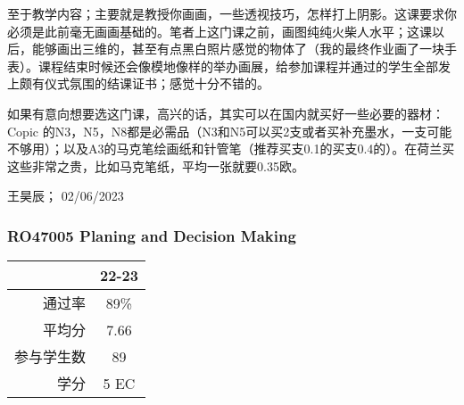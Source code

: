 至于教学内容；主要就是教授你画画，一些透视技巧，怎样打上阴影。这课要求你必须是此前毫无画画基础的。笔者上这门课之前，画图纯纯火柴人水平；这课以后，能够画出三维的，甚至有点黑白照片感觉的物体了（我的最终作业画了一块手表）。课程结束时候还会像模地像样的举办画展，给参加课程并通过的学生全部发上颇有仪式氛围的结课证书；感觉十分不错的。

如果有意向想要选这门课，高兴的话，其实可以在国内就买好一些必要的器材：Copic 的N3，N5，N8都是必需品（N3和N5可以买2支或者买补充墨水，一支可能不够用）；以及A3的马克笔绘画纸和针管笔（推荐买支0.1的买支0.4的）。在荷兰买这些非常之贵，比如马克笔纸，平均一张就要0.35欧。
\begin{flushright}
王昊辰； 02/06/2023
\end{flushright}

\subsubsection{RO47005 Planing and Decision Making}
\begin{minipage}{0.45\textwidth}
\centering
{}
\end{minipage}%
\begin{minipage}{0.45\textwidth}
\raggedleft
\begin{tabular}{r|c}
\textbf{ } & \textbf{22-23} \\ \hline
通过率 & 89\% \\ 
平均分 & 7.66 \\ 
参与学生数 & 89 \\ 
学分 & 5 EC\\
\end{tabular}
\end{minipage}\\

